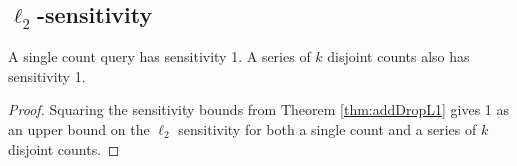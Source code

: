 \documentclass[11pt]{scrartcl} %
\begin{document}
\subsection{$\ell_2$-sensitivity}
\begin{theorem}
A single count query has sensitivity 1. A series of $k$ disjoint counts also has sensitivity 1.
\end{theorem}

\begin{proof}
Squaring the sensitivity bounds from Theorem \ref{thm:addDropL1} gives 1 as an upper bound on the $\ell_2$ sensitivity for both a single count and a series of $k$ disjoint counts.
\end{proof}
% 
% 
\end{document}
